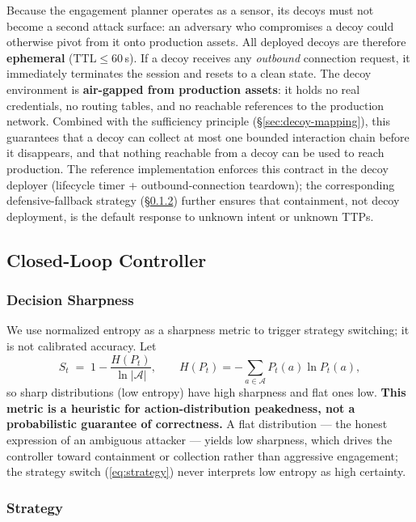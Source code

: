 \documentclass[11pt]{article}
\begin{document}
Because the engagement planner operates as a sensor, its decoys must not
become a second attack surface: an adversary who compromises a decoy could
otherwise pivot from it onto production assets. All deployed decoys are
therefore \textbf{ephemeral} ($\mathrm{TTL} \leq 60$\,s). If a decoy
receives any \textit{outbound} connection request, it immediately terminates
the session and resets to a clean state. The decoy environment is
\textbf{air-gapped from production assets}: it holds no real credentials, no
routing tables, and no reachable references to the production network.
Combined with the sufficiency principle (\S\ref{sec:decoy-mapping}), this
guarantees that a decoy can collect at most one bounded interaction chain
before it disappears, and that nothing reachable from a decoy can be used to
reach production. The reference implementation enforces this contract in the
decoy deployer (lifecycle timer + outbound-connection teardown); the
corresponding defensive-fallback strategy (\S\ref{sec:strategy}) further
ensures that containment, not decoy deployment, is the default response to
unknown intent or unknown TTPs.

\subsection{Closed-Loop Controller}
\label{sec:controller}

\subsubsection{Decision Sharpness}
\label{sec:sharpness-formal}

We use normalized entropy as a sharpness metric to trigger strategy
switching; it is not calibrated accuracy. Let
\begin{equation}
\label{eq:sharpness}
S_t \;=\; 1 - \frac{H(P_t)}{\ln |\mathcal{A}|},
\qquad
H(P_t) = -\sum_{a \in \mathcal{A}} P_t(a) \ln P_t(a),
\end{equation}
so sharp distributions (low entropy) have high sharpness and flat ones low.
\textbf{This metric is a heuristic for action-distribution peakedness, not a
probabilistic guarantee of correctness.} A flat distribution --- the honest
expression of an ambiguous attacker --- yields low sharpness, which drives
the controller toward containment or collection rather than aggressive
engagement; the strategy switch (\ref{eq:strategy}) never interprets low
entropy as high certainty.

\subsubsection{Strategy}
\label{sec:strategy}
\end{document}
